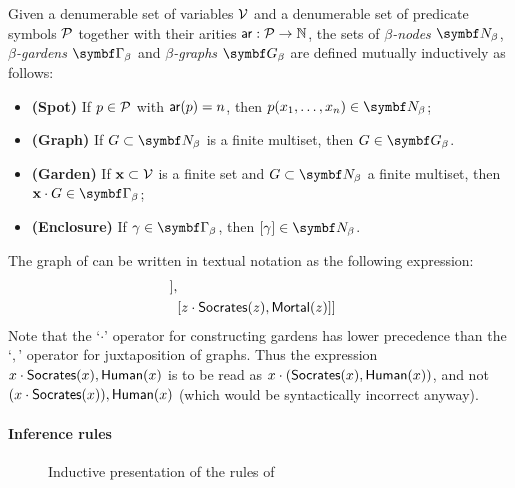 \begin{definition} 
  
  Given a denumerable set of variables $\mathcal{V}$ and a denumerable set of
  predicate symbols $\mathcal{P}$ together with their arities $\mathsf{ar} : \mathcal{P} \to
  \mathbb{N}$, the sets of \emph{$\beta$-nodes} $\bnodes$, \emph{$\beta$-gardens}
  $\bgardens$ and \emph{$\beta$-graphs} $\bgraphs$ are defined mutually
  inductively as follows:
  \begin{itemize}
    \item \textbf{(Spot)} If $p \in \mathcal{P}$ with $\mathsf{ar}(p) = n$, then $p(x_1,
    \ldots, x_n) \in \bnodes$;
    \item \textbf{(Graph)} If $G \subset \bnodes$ is a finite multiset, then $G
    \in \bgraphs$.
    \item \textbf{(Garden)} If $\mathbf{x} \subset \mathcal{V}$ is a finite set and $G
    \subset \bnodes$ a finite multiset, then $\garden{\mathbf{x}}{G} \in
    \bgardens$;
    \item \textbf{(Enclosure)} If $\gamma \in \bgardens$, then $[\gamma] \in \bnodes$.
  \end{itemize}
\end{definition}

\begin{example}
  The graph of  can be written in textual
  notation as the following expression:
  \begin{align*}
    [&x \cdot \socrates(x),\human(x), \\
     &[y \cdot \human(y),[{} \cdot \mortal(y)]], \\
     &[z \cdot \socrates(z),\mortal(z)]]
  \end{align*}
  Note that the `$\cdot$' operator for constructing gardens has lower precedence
  than the `$,$' operator for juxtaposition of graphs. Thus the expression $x
  \cdot \mbox{\textsf{Socrates}}(x),\mbox{\textsf{Human}}(x)$ is to be read as $x \cdot
  (\mbox{\textsf{Socrates}}(x),\mbox{\textsf{Human}}(x))$, and not $(x \cdot \mbox{\textsf{Socrates}}(x)),\mbox{\textsf{Human}}(x)$ (which
  would be syntactically incorrect anyway).
\end{example}

\paragraph{Inference rules}

\begin{figure}
  
  \caption{Inductive presentation of the rules of }
\end{figure}

